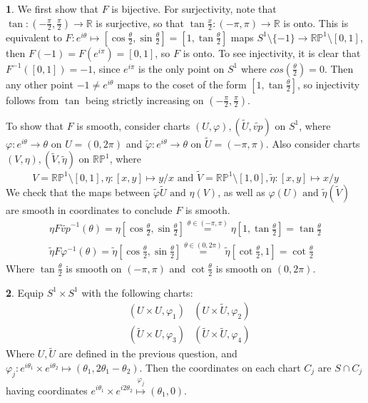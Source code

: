 \documentclass[10.5pt]{article}
\theoremstyle{definition}
\newtheorem{pb}{}
\newcommand{\set}[1]{\{#1\}}
\newcommand{\tand}{\text{ and }}
\newcommand{\vp}{\varphi}
\begin{document}
    \begin{pb}
        We first show that \(F\) is bijective. For surjectivity, note that \(\tan: (-\frac{\pi}{2},\frac{\pi}{2}) \to \mathbb{R}\) is surjective, so that
        \(\tan \frac{x}{2}: (-\pi,\pi) \to \mathbb{R}\) is onto. This is equivalent to \(F: e^{i\theta} \mapsto [\cos \frac{\theta}{2}, \sin \frac{\theta}{2}] = [1,\tan \frac{\theta}{2}]\)
        maps \(S^1 \setminus \set{-1} \to \mathbb{RP}^1 \setminus [0,1]\), then \(F(-1) = F(e^{i\pi}) = [0,1]\), so \(F\) is onto. To see injectivity, it is clear that
        \(F^{-1}([0,1]) = -1\), since \(e^{i\pi}\) is the only point on \(S^1\) where \(cos(\frac{\theta}{2}) = 0\). Then any other point \(-1 \neq e^{i\theta}\) maps to the coset of the form
        \([1,\tan \frac{\theta}{2}]\), so injectivity follows from \(\tan\) being strictly increasing on \((-\frac{\pi}{2}, \frac{\pi}{2})\).

        To show that \(F\) is smooth, consider charts \((U,\vp), (\tilde{U},\tilde{vp})\) on \(S^1\), where \(\vp: e^{i\theta} \to \theta\) on \(U = (0,2\pi)\) and 
        \(\tilde{\vp}: e^{i\theta} \to \theta\) on
        \(\tilde{U} = (-\pi,\pi)\). Also consider charts \((V,\eta), (\tilde{V},\tilde{\eta})\) on \(\mathbb{RP}^1\), where 
        \[V = \mathbb{RP}^1 \setminus [0,1], \eta: [x,y] \mapsto y/x \tand \tilde{V} = \mathbb{RP}^1 \setminus [1,0], \tilde{\eta}: [x,y] \mapsto x/y\]
        We check that the maps between \(\tilde{\vp}\tilde{U} \tand \eta(V)\), as well as \(\vp(U) \tand \tilde{\eta}(\tilde{V})\) are smooth in coordinates to conclude \(F\) is smooth.
        \begin{align*}
            \eta F \tilde{vp}^{-1} (\theta) = \eta [\cos \frac{\theta}{2}, \sin \frac{\theta}{2}] \overset{\theta \in (-\pi,\pi)}{=} \eta [1, \tan \frac{\theta}{2}] = \tan \frac{\theta}{2} \\
            \tilde{\eta} F \vp^{-1} (\theta) = \tilde{\eta} [\cos \frac{\theta}{2}, \sin \frac{\theta}{2}] \overset{\theta \in (0,2\pi)}{=} \tilde{\eta} [\cot \frac{\theta}{2},1] = \cot \frac{\theta}{2}
        \end{align*}
        Where \(\tan \frac{\theta}{2}\) is smooth on \((-\pi,\pi)\) and \(\cot \frac{\theta}{2}\) is smooth on \((0,2\pi)\).
    \end{pb}
    \begin{pb}
        Equip \(S^1 \times S^1\) with the following charts:
        \begin{align*}
            &(U \times U, \vp_1) &(U \times \tilde{U}, \vp_2) \\
            &(\tilde{U} \times U, \vp_3) &(\tilde{U} \times \tilde{U}, \vp_4)
        \end{align*}
        Where \(U, \tilde{U}\) are defined in the previous question, and \(\vp_j: e^{i\theta_1} \times e^{i\theta_2} \mapsto (\theta_1,2\theta_1 - \theta_2)\).
        Then the coordinates on each chart \(C_j\) are \(S \cap C_j\) having coordinates \(e^{i\theta_1} \times e^{i2\theta_2} \overset{\vp_j}{\mapsto} (\theta_1,0)\).
    \end{pb}
\end{document}
